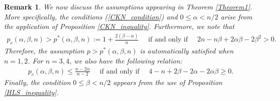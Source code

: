 \documentclass[11pt,reqno]{amsart}
\newtheorem{remark}{Remark}[section]
\begin{document}
\begin{remark}\label{Remark1.1}
\selectfont
    We now discuss the assumptions appearing in Theorem \ref{Theorem1}. More specifically, the conditions (\ref{CKN_condition}) and $0 \leq \alpha < n/2$ arise from the application of Proposition \ref{CKN_inquality}. Furthermore,  we note that 
    \begin{align}
    p_c(\alpha, \beta,n) > p^*(\alpha, \beta, n) := 1+\frac{2(\beta-\alpha)}{n} \quad\text{ if and only if }\quad  2n-n\beta +2\alpha\beta -  2\beta^2 > 0. \label{Relation1}
    \end{align}
    Therefore, the assumption $p > p^*(\alpha, \beta,n)$ is automatically satisfied when $n=1,2$. For $n=3,4$, we also have the following relation:
    \begin{align}
        p_c(\alpha, \beta,n) \leq \frac{n-2\alpha}{n-2} \quad \text{ if and only if }\quad 4-n+2\beta-2\alpha -2\alpha\beta \geq 0. \label{Relation2}
    \end{align}
    Finally, the condition $0 \leq \beta < n/2$ appears from the use of Proposition \ref{HLS_inequality}.
\end{remark}

    
\end{document}
